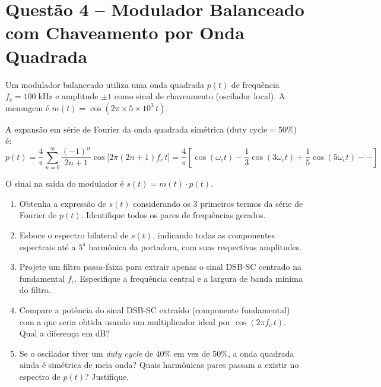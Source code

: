 \documentclass[11pt,a4paper]{article}
\begin{document}
\section*{Questão 4 -- Modulador Balanceado com Chaveamento por Onda Quadrada}

Um modulador balanceado utiliza uma onda quadrada $p(t)$ de frequência $f_c = 100\;\text{kHz}$ e amplitude $\pm 1$ como sinal de chaveamento (oscilador local). A mensagem é $m(t) = \cos(2\pi \times 5 \times 10^3\,t)$.

A expansão em série de Fourier da onda quadrada simétrica ($\text{duty cycle} = 50\%$) é:
\[
  p(t) = \frac{4}{\pi}\sum_{n=0}^{\infty} \frac{(-1)^n}{2n+1}\cos\!\big[2\pi(2n+1)f_c\,t\big]
  = \frac{4}{\pi}\!\left[\cos(\omega_c t) - \frac{1}{3}\cos(3\omega_c t) + \frac{1}{5}\cos(5\omega_c t) - \cdots\right]
\]

O sinal na saída do modulador é $s(t) = m(t) \cdot p(t)$.

\begin{enumerate}[label=\alph*)]
  \item Obtenha a expressão de $s(t)$ considerando os 3 primeiros termos da série de Fourier de $p(t)$. Identifique todos os pares de frequências gerados.
  \item Esboce o espectro bilateral de $s(t)$, indicando todas as componentes espectrais até a $5^{\text{a}}$ harmônica da portadora, com suas respectivas amplitudes.
  \item Projete um filtro passa-faixa para extrair apenas o sinal DSB-SC centrado na fundamental $f_c$. Especifique a frequência central e a largura de banda mínima do filtro.
  \item Compare a potência do sinal DSB-SC extraído (componente fundamental) com a que seria obtida usando um multiplicador ideal por $\cos(2\pi f_c\,t)$. Qual a diferença em dB?
  \item Se o oscilador tiver um \textit{duty cycle} de $40\%$ em vez de $50\%$, a onda quadrada ainda é simétrica de meia onda? Quais harmônicas pares passam a existir no espectro de $p(t)$? Justifique.
\end{enumerate}

\end{document}
